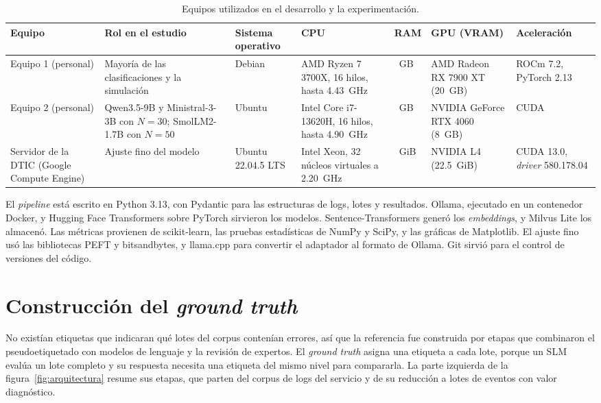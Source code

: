 \begin{table}[H]
\centering
\caption{Equipos utilizados en el desarrollo y la experimentación.}
\label{tab:met_equipos}
\footnotesize\linespread{1}\selectfont
\setlength{\tabcolsep}{4pt}
\begin{tabularx}{\textwidth}{@{}>{\raggedright\arraybackslash}p{2.1cm}>{\raggedright\arraybackslash}X>{\raggedright\arraybackslash}p{1.6cm}>{\raggedright\arraybackslash}X>{\raggedright\arraybackslash}p{1.4cm}>{\raggedright\arraybackslash}X>{\raggedright\arraybackslash}p{1.9cm}@{}}
\toprule
\textbf{Equipo} & \textbf{Rol en el estudio} & \textbf{Sistema operativo} & \textbf{CPU} & \textbf{RAM} & \textbf{GPU (VRAM)} & \textbf{Aceleración} \\
\midrule
Equipo 1 (personal) & Mayoría de las clasificaciones y la simulación & Debian & AMD Ryzen 7 3700X, 16 hilos, hasta 4.43~GHz & 24~GB & AMD Radeon RX 7900 XT (20~GB) & ROCm 7.2, PyTorch 2.13 \\
\addlinespace
Equipo 2 (personal) & Qwen3.5-9B y Ministral-3-3B con $N=30$; SmolLM2-1.7B con $N=50$ & Ubuntu & Intel Core i7-13620H, 16 hilos, hasta 4.90~GHz & 16~GB & NVIDIA GeForce RTX 4060 (8~GB) & CUDA \\
\addlinespace
Servidor de la DTIC (Google Compute Engine) & Ajuste fino del modelo & Ubuntu 22.04.5 LTS & Intel Xeon, 32 núcleos virtuales a 2.20~GHz & 125.8~GiB & NVIDIA L4 (22.5~GiB) & CUDA 13.0, \textit{driver} 580.178.04 \\
\bottomrule
\end{tabularx}
\normalsize
\end{table}

El \textit{pipeline} está escrito en Python 3.13, con Pydantic para las estructuras de logs, lotes y resultados. Ollama, ejecutado en un contenedor Docker, y Hugging Face Transformers sobre PyTorch sirvieron los modelos. Sentence-Transformers generó los \textit{embeddings}, y Milvus Lite los almacenó. Las métricas provienen de scikit-learn, las pruebas estadísticas de NumPy y SciPy, y las gráficas de Matplotlib. El ajuste fino usó las bibliotecas PEFT y bitsandbytes, y llama.cpp para convertir el adaptador al formato de Ollama. Git sirvió para el control de versiones del código.

\section{Construcción del \textit{ground truth}}\label{sec:met_gt}

No existían etiquetas que indicaran qué lotes del corpus contenían errores, así que la referencia fue construida por etapas que combinaron el pseudoetiquetado con modelos de lenguaje y la revisión de expertos. El \textit{ground truth} asigna una etiqueta a cada lote, porque un SLM evalúa un lote completo y su respuesta necesita una etiqueta del mismo nivel para compararla. La parte izquierda de la figura~\ref{fig:arquitectura} resume sus etapas, que parten del corpus de logs del servicio y de su reducción a lotes de eventos con valor diagnóstico.


